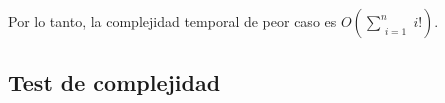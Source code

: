 Por lo tanto, la complejidad temporal de peor caso es $O\left(\sum\limits_{\substack{i = 1}}^n i!\right)$.

\subsection{Test de complejidad}

